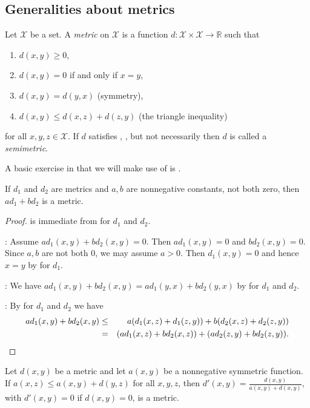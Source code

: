 		\subsection{Generalities about metrics}
		\begin{definition}\label{def:metric}
			\leanok
		Let $\mathcal X$ be a set.
			A \emph{metric} on $\mathcal X$ is a function
			$d : \mathcal X \times \mathcal X \to \mathbb R$ such that
			\begin{enumerate}
				\item\label{met-nonneg} $d(x, y) \ge 0$,
				\item\label{met-0} $d(x, y) = 0$ if and only if $x = y$,
				\item\label{met-symm} $d(x, y) = d(y, x)$ (symmetry),
				\item\label{met-tri} $d(x,y)\le d(x,z)+d(z,y)$ (the triangle inequality)
			\end{enumerate}
			for all $x,y,z\in\mathcal X$.
			If $d$ satisfies , ,  but not necessarily  then $d$ is called a \emph{semimetric}.
		\end{definition}
		A basic exercise in  that we will make use of is .
		\begin{theorem}\label{lin-comb-metric}
			 If $d_1$ and $d_2$ are metrics and $a,b$ are nonnegative constants, not both zero, then $ad_1+bd_2$ is a metric.
		\end{theorem}
		\begin{proof}
			 is immediate from  for $d_1$ and $d_2$.

			: Assume $ad_1(x,y)+bd_2(x,y)=0$. Then $ad_1(x,y)=0$ and $bd_2(x,y)=0$.
			Since $a,b$ are not both 0, we may assume $a>0$. Then $d_1(x,y)=0$ and hence $x=y$ by  for $d_1$.

			: We have $ad_1(x,y)+bd_2(x,y)=ad_1(y,x)+bd_2(y,x)$ by  for $d_1$ and $d_2$.

			: By  for $d_1$ and $d_2$ we have
			\begin{eqnarray*}
			ad_1(x,y)+bd_2(x,y)&\le& a(d_1(x,z)+d_1(z,y))+b(d_2(x,z)+d_2(z,y))\\ &=& (ad_1(x,z)+bd_2(x,z)) + (ad_2(z,y)+bd_2(z,y)).\qedhere			 
			\end{eqnarray*}
		\end{proof}
		\begin{lemma}\label{mar29-2022}
			Let $d(x,y)$ be a metric and let $a(x,y)$ be a nonnegative symmetric function. If $a(x,z)\le a(x,y)+d(y,z)$ for all $x,y,z$,
			then $d'(x,y)=\frac{d(x,y)}{a(x,y)+d(x,y)}$,
			with $d'(x,y)=0$ if $d(x,y)=0$, is a metric.
		\end{lemma}
